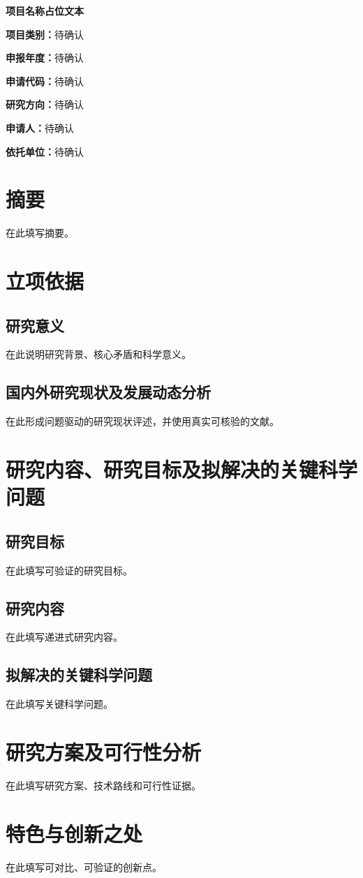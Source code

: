 \documentclass[UTF8,12pt]{ctexart}
\begin{document}
\begin{center}
  {\Large\bfseries 项目名称占位文本}\par
\end{center}

\noindent\textbf{项目类别：}待确认\par
\noindent\textbf{申报年度：}待确认\par
\noindent\textbf{申请代码：}待确认\par
\noindent\textbf{研究方向：}待确认\par
\noindent\textbf{申请人：}待确认\par
\noindent\textbf{依托单位：}待确认\par

\section*{摘要}

在此填写摘要。

\section*{立项依据}

\subsection*{研究意义}

在此说明研究背景、核心矛盾和科学意义。

\subsection*{国内外研究现状及发展动态分析}

在此形成问题驱动的研究现状评述，并使用真实可核验的文献。

\section*{研究内容、研究目标及拟解决的关键科学问题}

\subsection*{研究目标}

在此填写可验证的研究目标。

\subsection*{研究内容}

在此填写递进式研究内容。

\subsection*{拟解决的关键科学问题}

在此填写关键科学问题。

\section*{研究方案及可行性分析}

在此填写研究方案、技术路线和可行性证据。

\section*{特色与创新之处}

在此填写可对比、可验证的创新点。
\end{document}
